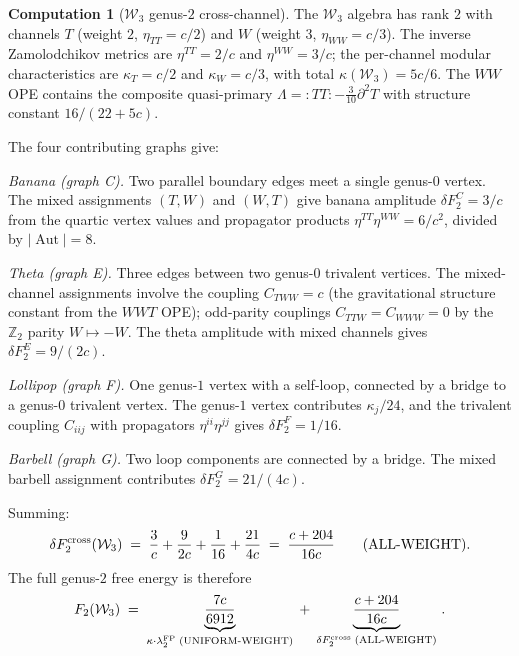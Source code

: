 \documentclass[11pt]{article}
\theoremstyle{definition}
\newtheorem{computation}[theorem]{Computation}
\theoremstyle{remark}
\newcommand{\Walg}{\mathcal{W}}
\newcommand{\FP}{\mathrm{FP}}
\newcommand{\cross}{\mathrm{cross}}
\DeclareMathOperator{\Aut}{Aut}
\numberwithin{equation}{section}
\begin{document}
\begin{computation}[$\Walg_3$ genus-$2$ cross-channel]\label{comp:w3-genus2}
The $\Walg_3$ algebra has rank $2$ with channels
$T$ (weight $2$, $\eta_{TT} = c/2$) and
$W$ (weight $3$, $\eta_{WW} = c/3$).
The inverse Zamolodchikov metrics are
$\eta^{TT} = 2/c$ and $\eta^{WW} = 3/c$;
the per-channel modular characteristics are
	$\kappa_T = c/2$ and $\kappa_W = c/3$, with total
$\kappa(\Walg_3) = 5c/6$.
The $WW$ OPE contains the composite quasi-primary
$\Lambda = {:}TT{:} - \tfrac{3}{10}\partial^2 T$
with structure constant $16/(22{+}5c)$.

The four contributing graphs give:

\emph{Banana \textup{(}graph C\textup{)}.}
Two parallel boundary edges meet a single genus-$0$ vertex.
The mixed assignments $(T,W)$ and $(W,T)$ give
banana amplitude
$\delta F_2^{C} = 3/c$
from the quartic vertex values and propagator products
$\eta^{TT}\eta^{WW} = 6/c^2$, divided by
$|\Aut| = 8$.

\emph{Theta \textup{(}graph E\textup{)}.}
Three edges between two genus-$0$ trivalent vertices.
The mixed-channel assignments involve the coupling
$C_{TWW} = c$ (the gravitational structure constant from
the $WWT$ OPE); odd-parity couplings $C_{TTW} = C_{WWW} = 0$
by the $\mathbb{Z}_2$ parity $W \mapsto -W$.
The theta amplitude with mixed channels gives
$\delta F_2^{E} = 9/(2c)$.

\emph{Lollipop \textup{(}graph F\textup{)}.}
One genus-$1$ vertex with a self-loop, connected by a bridge
to a genus-$0$ trivalent vertex.
The genus-$1$ vertex contributes $\kappa_j/24$, and the
trivalent coupling $C_{iij}$ with propagators
$\eta^{ii}\eta^{jj}$ gives
$\delta F_2^{F} = 1/16$.

\emph{Barbell \textup{(}graph G\textup{)}.}
Two loop components are connected by a bridge. The mixed barbell
assignment contributes
$\delta F_2^{G}=21/(4c)$.

Summing:
\begin{equation}\label{eq:w3-genus2-cross-result}
 \delta F_2^{\cross}(\Walg_3)
 \;=\;
 \frac{3}{c}
 + \frac{9}{2c}
 + \frac{1}{16}
 + \frac{21}{4c}
 \;=\;
 \frac{c + 204}{16c}
 \qquad\text{\textup{(}ALL-WEIGHT\textup{)}}.
\end{equation}
The full genus-$2$ free energy is therefore
\begin{equation}\label{eq:w3-genus2-full}
 F_2(\Walg_3)
 \;=\;
 \underbrace{\frac{7c}{6912}}_{\kappa \cdot \lambda_2^{\FP}
 \;\text{\textup{(}UNIFORM-WEIGHT\textup{)}}}
 \;+\;
 \underbrace{\frac{c + 204}{16c}}_{\delta F_2^{\cross}
 \;\text{\textup{(}ALL-WEIGHT\textup{)}}}\,.
\end{equation}
\end{computation}
\end{document}
